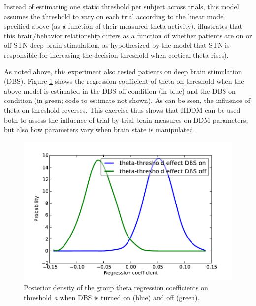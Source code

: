 \documentclass[letterpaper,10pt,english]{article}
\begin{document}
Instead of estimating one static threshold per subject across trials, this model assumes the threshold to vary on each trial according to the linear model specified above (as a function of their measured theta activity). \citet{CavanaghWieckiCohenEtAl11} illustrates that this brain/behavior relationship differs as a function of whether patients are on or off STN deep brain stimulation, as hypothesized by the model that STN is responsible for increasing the decision threshold when cortical theta rises).

As noted above, this experiment also tested patients on deep brain stimulation (DBS). Figure \ref{fig.post_theta} shows the regression coefficient of theta on threshold when the above model is estimated in the DBS off condition (in blue) and the DBS on condition (in green; code to estimate not shown). As can be seen, the influence of theta on threshold reverses. This exercise thus shows that HDDM can be used both to assess the influence of trial-by-trial brain measures on DDM parameters, but also how parameters vary when brain state is manipulated.

\begin{figure}
\includegraphics[scale=0.6]{theta_threshold_on_off.pdf}
\caption{Posterior density of the group theta regression coefficients on threshold \emph{a} when DBS is turned on (blue) and off (green).}
\label{fig.post_theta}
\end{figure}
\end{document}
